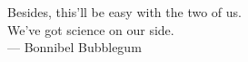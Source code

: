 \cleardoublepage
\thispagestyle{empty}


\vspace*{3cm}


\begin{raggedleft}
	Besides, this'll be easy with the two of us. \\ We've got science on our side. \\
	--- Bonnibel Bubblegum\\
\end{raggedleft}

\vspace{4cm}



